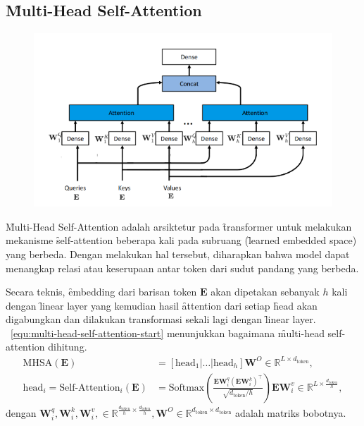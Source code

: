 	\subsection{\f{Multi-Head Self-Attention}}
	\begin{figure}
		\centering
		\includegraphics[width=1\textwidth]{assets/pics/MHSA.png}
		\label{fig:multi-head-self-attention}
	\end{figure}

	\f{Multi-Head Self-Attention} adalah arsiktetur pada \f{transformer} untuk melakukan mekanisme \f{self-attention} beberapa kali pada subruang (\f{learned embedded space}) yang berbeda. Dengan melakukan hal tersebut, diharapkan bahwa model dapat menangkap relasi atau keserupaan antar token dari sudut pandang yang berbeda. 

	Secara teknis, \f{embedding} dari barisan token $\mathbf{E}$ akan dipetakan sebanyak $h$ kali dengan \f{linear layer} yang kemudian hasil \f{attention} dari setiap \f{head} akan digabungkan dan dilakukan transformasi sekali lagi dengan \f{linear layer}. \equ~\ref{equ:multi-head-self-attention-start} menunjukkan bagaimana \f{multi-head self-attention} dihitung.
	\begin{align}
		\label{equ:multi-head-self-attention-start}
		\text{MHSA}(\mathbf{E}) &= [\text{head}_1 | \dots | \text{head}_h] \mathbf{W}^O \in \mathbb{R}^{L \times d_{\text{token}}}, \\
		\text{head}_i = \text{Self-Attention}_i(\mathbf{E}) &= \text{Softmax}(\frac{\mathbf{E} \mathbf{W}^q_i (\mathbf{E} \mathbf{W}^k_i)^{\top}}{\sqrt{d_{\text{token}}/h}}) \mathbf{E} \mathbf{W}^v_i  \in  \mathbb{R}^{L \times \frac{d_{\text{token}}}{h}},
	\end{align}
	dengan $\mathbf{W}^q_i, \mathbf{W}^k_i, \mathbf{W}^v_i,\in \mathbb{R}^{\frac{d_{\text{token}}}{h} \times \frac{d_{\text{token}}}{h}}, \mathbf{W}^O \in \mathbb{R}^{d_{\text{token}} \times d_{\text{token}}}$ adalah matriks bobotnya.

